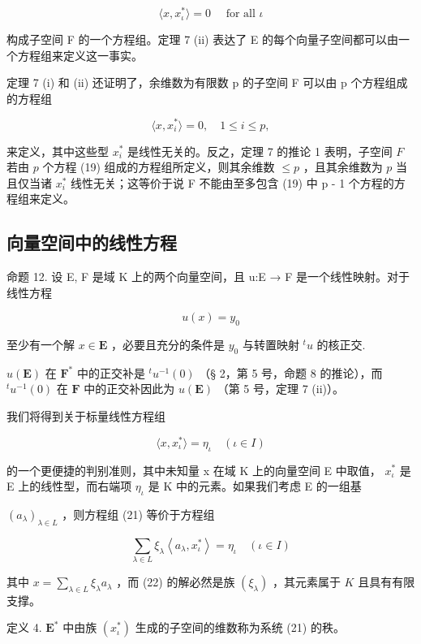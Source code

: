 \[
\langle x, x _ {\iota} ^ {*} \rangle = 0 \quad \text { for   all } \iota
\]

构成子空间 F 的一个方程组。定理 7 (ii) 表达了 E 的每个向量子空间都可以由一个方程组来定义这一事实。

定理 7 (i) 和 (ii) 还证明了，余维数为有限数 p 的子空间 F 可以由 p 个方程组成的方程组

\[
\langle x, x _ {i} ^ {*} \rangle = 0, \quad 1 \leqslant i \leqslant p,\tag{19}
\]

来定义，其中这些型 \(x_{i}^{*}\) 是线性无关的。反之，定理 7 的推论 1 表明，子空间 \(F\) 若由 \(p\) 个方程 (19) 组成的方程组所定义，则其余维数 \(\leqslant p\) ，且其余维数为 \(p\) 当且仅当诸 \(x_{i}^{*}\) 线性无关；这等价于说 F 不能由至多包含 (19) 中 p - 1 个方程的方程组来定义。

\subsection{向量空间中的线性方程}

命题 12. 设 E, F 是域 K 上的两个向量空间，且 u:E → F 是一个线性映射。对于线性方程

\[
u (x) = y _ {0}\tag{20}
\]

至少有一个解 \(x \in \mathbf{E}\) ，必要且充分的条件是 \(y_0\) 与转置映射 \(^t u\) 的核正交.

\(u(\mathbf{E})\) 在 \(\mathbf{F}^*\) 中的正交补是 \({}^t u^{-1}(0)\) （§ 2，第 5 号，命题 8 的推论），而 \({}^t u^{-1}(0)\) 在 \(\mathbf{F}\) 中的正交补因此为 \(u(\mathbf{E})\) （第 5 号，定理 7 (ii)）。

我们将得到关于标量线性方程组

\[
\langle x, x _ {\iota} ^ {*} \rangle = \eta_ {\iota} \quad (\iota \in I)\tag{21}
\]

的一个更便捷的判别准则，其中未知量 x 在域 K 上的向量空间 E 中取值， \(x_{\iota}^{*}\) 是 E 上的线性型，而右端项 \(\eta_{\iota}\) 是 K 中的元素。如果我们考虑 E 的一组基

\((a_{\lambda})_{\lambda\in L}\) ，则方程组 (21) 等价于方程组

\[
\sum_ {\lambda \in L} \xi_ {\lambda} \left\langle a _ {\lambda}, x _ {\iota} ^ {*} \right\rangle = \eta_ {\iota} \quad (\iota \in I)\tag{22}
\]

其中 \(x = \sum_{\lambda \in L} \xi_{\lambda} a_{\lambda}\) ，而 (22) 的解必然是族 \((\xi_{\lambda})\) ，其元素属于 \(K\) 且具有有限支撑。

定义 4. \(\mathbf{E}^*\) 中由族 \((x_{\iota}^{*})\) 生成的子空间的维数称为系统 (21) 的秩。

